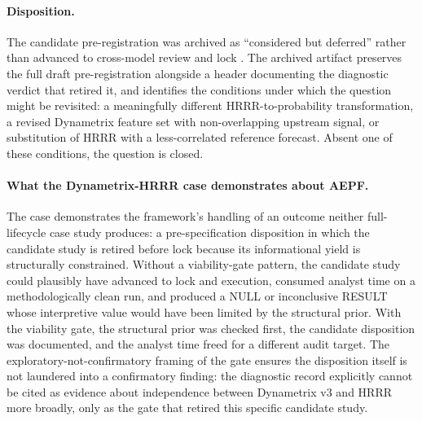 \documentclass[11pt]{article}
\begin{document}
\paragraph{Disposition.}
The candidate pre-registration was archived as ``considered but
deferred'' rather than advanced to cross-model review and lock
\cite{dixon2026dynametrixhrrr}. The archived artifact preserves
the full draft pre-registration alongside a header documenting
the diagnostic verdict that retired it, and identifies the
conditions under which the question might be revisited: a
meaningfully different HRRR-to-probability transformation, a
revised Dynametrix feature set with non-overlapping upstream
signal, or substitution of HRRR with a less-correlated reference
forecast. Absent one of these conditions, the question is closed.

\paragraph{What the Dynametrix-HRRR case demonstrates about AEPF.}
The case demonstrates the framework's handling of an outcome
neither full-lifecycle case study produces: a pre-specification
disposition in which the candidate study is retired before lock
because its informational yield is structurally constrained.
Without a viability-gate pattern, the candidate study could
plausibly have advanced to lock and execution, consumed analyst
time on a methodologically clean run, and produced a NULL or
inconclusive RESULT whose interpretive value would have been
limited by the structural prior. With the viability gate, the
structural prior was checked first, the candidate disposition was
documented, and the analyst time freed for a different audit
target. The exploratory-not-confirmatory framing of the gate
ensures the disposition itself is not laundered into a
confirmatory finding: the diagnostic record explicitly cannot be
cited as evidence about independence between Dynametrix v3 and
HRRR more broadly, only as the gate that retired this specific
candidate study.
\end{document}
